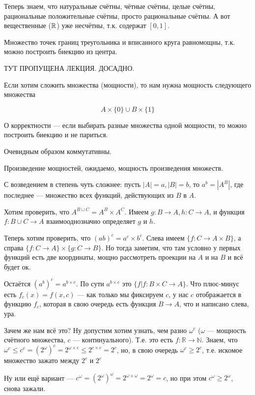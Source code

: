 Теперь знаем, что натуральные счётны, чётные счётны, целые счётны, рациональные положительные счётны, просто рациональные счётны. А вот вещественные ($\mathbb{R}$) уже несчётны, т.к. содержат $[0, 1]$.

\begin{example}
	Множество точек границ треугольника и вписанного круга равномощны, т.к. можно построить биекцию из центра. 
\end{example}

ТУТ ПРОПУЩЕНА ЛЕКЦИЯ. ДОСАДНО.


Если хотим сложить множества (мощности), то нам нужна мощность следующего множества

{
\large
$$
A \times \{0\} \cup B \times \{1\}
$$
}

О корректности --- если выбирать разные множества одной мощности, то можно построить биекцию и не париться.

Очевидным образом коммутативны.

Произведение мощностей, ожидаемо, мощность произведения множеств.

С возведением в степень чуть сложнее: пусть $|A| = a, |B| = b$, то $a^b = |A^B|$, где последнее --- множество всех функций, действующих из $B$ в $A$.

Хотим проверить, что $A^{B \sqcup C} = A^B \times A^C$. Имеем $g : B \to A, h : C \to A$, и функция $f : B \cup C \to A$ взаимооднозначно определяет $g $ и $h$.

Теперь хотим проверить, что $(ab)^c = a^c \times b^c$. Слева имеем $\{f : C \to A \times B\}$, а справа $\{ f : C \to A  \} \times \{g : C \to B\}$. Но тогда заметим, что там условно у первых функций есть две координаты, мощно рассмотреть проекции  на $A$ и на $B$ и всё будет ок.

Остаётся $(a ^ b)^c = a^{b \times c}$. По сути $a^{b \times c}$ это $\{f | f : B \times C \to A\}$. Что плюс-минус есть $f_c(x) = f(x, c)$ --- как только мы фиксируем $c$, у нас $c$ отображается в функцию $f_c$, которая в свою очередь есть функция $B \to A$, что и написано слева, ура.

Зачем же нам всё это? Ну допустим хотим узнать, чем разно $\omega^c$ ($\omega $ --- мощность счётного множества, $c$ --- континуального). Т.е. это есть $f : \mathbb{R} \to \mathbb{N}$. Знаем, что $\omega^c \le c^c = (2^{\omega})^c = 2^{\omega \times c} \le 2^{c \times c} = 2^{c}$, но, в свою очередь $\omega ^ c \ge 2^c$, т.е. искомое множество зажато между $2^c$ и $2^c$

Ну или ещё вариант --- $c^{\omega} = (2^{\omega})^{\omega} = 2^{\omega \times \omega} = 2^{\omega} = c$, но при этом $c^{\omega} \ge 2^{\omega}$, снова зажали.

